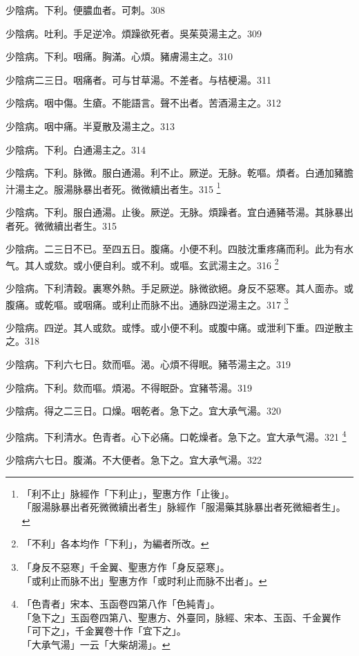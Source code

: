少陰病。下利。便膿血者。可刺。308

少陰病。吐利。手足逆{\khaaitp 冷}。煩躁欲死者。{\khaaitp 吳}茱萸湯主之。309

少陰病。下利。咽痛。胸滿。心煩。豬膚湯主之。310

少陰病二三日。咽痛者。可与甘草湯。不差者。与桔梗湯。311

少陰病。咽中傷。生瘡。不能語言。聲不出者。苦酒湯主之。312

少陰病。咽中痛。半夏散及湯主之。313

少陰病。下利。白通湯主之。314

少陰病。下利。脉微。服白通湯。利不止。厥逆。无脉。乾嘔。煩者。白通加豬膽汁湯主之。服湯脉暴出者死。微{\khaaitp 微}續{\khaaitp 出}者生。315
	\footnote{「利不止」脉經作「下利止」，聖惠方作「止後」。\\「服湯脉暴出者死微微續出者生」脉經作「服湯藥其脉暴出者死微細者生」。}

少陰病。下利。服白通湯。止後。厥逆。无脉。煩躁者。宜白通豬苓湯。其脉暴出者死。微微續出者生。{\gaoben}315

少陰病。二三日不已。至四五日。腹痛。小便不利。四肢沈重疼痛而利。此为有水气。其人或欬。或小便{\khaaitp 自}利。或不利。或嘔。玄武湯主之。316
	\footnote{「不利」各本均作「下利」，为編者所改。}

少陰病。下利清穀。裏寒外熱。手足厥逆。脉微欲絕。身反不惡寒。其人面赤。或腹痛。或乾嘔。或咽痛。或利止{\khaaitp 而}脉不出。通脉四逆湯主之。317
	\footnote{「身反不惡寒」千金翼、聖惠方作「身反惡寒」。\\「或利止而脉不出」聖惠方作「或时利止而脉不出者」。}

少陰病。四逆。其人或欬。或悸。或小便不利。或腹中痛。或泄利下重。四逆散主之。318

少陰病。下利六七日。欬而嘔。渴。心煩不得眠。豬苓湯主之。319

少陰病。下利。欬而嘔。煩渴。不得眠卧。宜豬苓湯。{\gaoben}319

少陰病。得之二三日。口燥。咽乾者。急下之。宜{\khaaitp 大}承气湯。320

少陰病。{\khaaitp 下}利清水。色青者。心下必痛。口乾燥者。急下之。宜{\khaaitp 大}承气湯。321
	\footnote{「色青者」宋本、玉函卷四第八作「色純青」。\\「急下之」玉函卷四第八、聖惠方、外臺同，脉經、宋本、玉函、千金翼作「可下之」，千金翼卷十作「宜下之」。\\「大承气湯」一云「大柴胡湯」。}

少陰病六七日。腹滿。不大便者。急下之。宜{\khaaitp 大}承气湯。322

